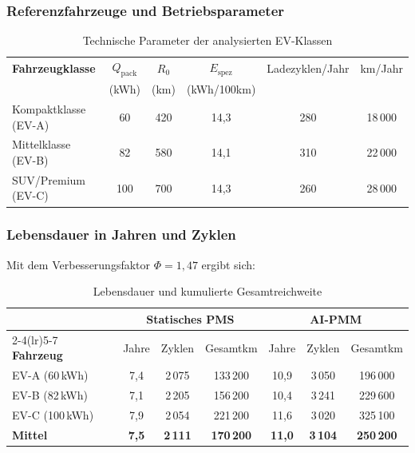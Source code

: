 ﻿\documentclass[12pt,a4paper]{article}
\begin{document}
	\subsubsection{Referenzfahrzeuge und Betriebsparameter}
	
	\begin{table}[H]
		\centering
		\caption{Technische Parameter der analysierten EV-Klassen}
		\label{tab:ev_params}
		\begin{tabular}{lccccc}
			\toprule
			\textbf{Fahrzeugklasse} & $Q_\mathrm{pack}$ & $R_0$ & $E_\mathrm{spez}$
			& Ladezyklen/Jahr & km/Jahr \\
			& (kWh) & (km) & (kWh/100km) & & \\
			\midrule
			Kompaktklasse (EV-A) & 60 & 420 & 14{,}3 & 280 & 18\,000 \\
			Mittelklasse (EV-B) & 82 & 580 & 14{,}1 & 310 & 22\,000 \\
			SUV/Premium (EV-C) & 100 & 700 & 14{,}3 & 260 & 28\,000 \\
			\bottomrule
		\end{tabular}
	\end{table}
	
	\subsubsection{Lebensdauer in Jahren und Zyklen}
	
	Mit dem Verbesserungsfaktor $\Phi = 1{,}47$ ergibt sich:
	
	\begin{table}[H]
		\centering
		\caption{Lebensdauer und kumulierte Gesamtreichweite}
		\label{tab:ev_lifetime}
		\begin{tabular}{lcccccc}
			\toprule
			& \multicolumn{3}{c}{\textbf{Statisches PMS}} & \multicolumn{3}{c}{\textbf{AI-PMM}} \\
			\cmidrule(lr){2-4}\cmidrule(lr){5-7}
			\textbf{Fahrzeug} & Jahre & Zyklen & Gesamtkm & Jahre & Zyklen & Gesamtkm \\
			\midrule
			EV-A (60\,kWh) & 7{,}4 & 2\,075 & 133\,200 & 10{,}9 & 3\,050 & 196\,000 \\
			EV-B (82\,kWh) & 7{,}1 & 2\,205 & 156\,200 & 10{,}4 & 3\,241 & 229\,600 \\
			EV-C (100\,kWh) & 7{,}9 & 2\,054 & 221\,200 & 11{,}6 & 3\,020 & 325\,100 \\
			\midrule
			\textbf{Mittel} & \textbf{7{,}5} & \textbf{2\,111} & \textbf{170\,200}
			& \textbf{11{,}0} & \textbf{3\,104} & \textbf{250\,200} \\
			\bottomrule
		\end{tabular}
	\end{table}
	
\end{document}
